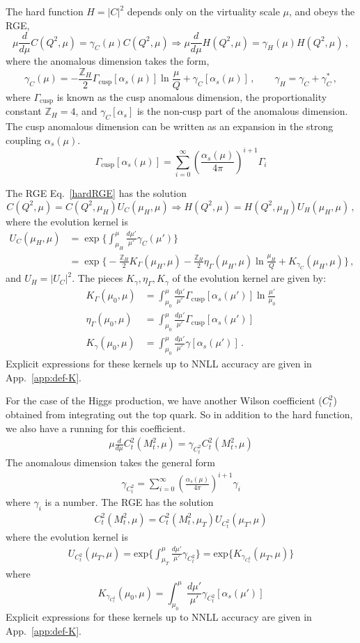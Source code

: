 \documentclass[a4,letterpaper,11pt]{article}
\newcommand{\nn}{\nonumber}
\newcommand{\be}{\begin{equation}}
\newcommand{\ee}{\end{equation}}
\newcommand{\bea}{\begin{eqnarray}}
\newcommand{\eea}{\end{eqnarray}}
\newcommand{\abs}[1]{\left\lvert #1\right\rvert}
\newcommand{\as}{\alpha_s}
\newcommand{\zed}{\mathbb{Z}}
\newcommand{\eq}[1]{Eq.~\eqref{#1}}
\newcommand{\appx}[1]{App.~\ref{app:#1}}
\begin{document}
The hard function $H=\abs{C}^2$ depends only on the virtuality scale $\mu$, and obeys the RGE,
\be
\label{hardRGE}
\mu\frac{d}{d\mu}C(Q^2,\mu) = \gamma_C(\mu)C(Q^2,\mu) \Rightarrow \mu\frac{d}{d\mu}H(Q^2,\mu) = \gamma_H(\mu)H(Q^2,\mu)\,,
\ee
where the anomalous dimension takes the form,
\be
\gamma_C(\mu) = -\frac{\zed_H}{2}\Gamma_{\text{cusp}}[\as(\mu)]\ln\frac{\mu}{Q} + \gamma_C[\as(\mu)] \,,\qquad \gamma_H = \gamma_C + \gamma_C^*\,,
\ee
where $\Gamma_{\text{cusp}}$ is known as the cusp anomalous dimension, the proportionality constant $\zed_H = 4$, and $\gamma_C[\as]$ is the non-cusp part of the anomalous dimension. The cusp anomalous dimension can be written as an expansion in the strong coupling $\alpha_s(\mu)$. 
\be
\Gamma_{\text{cusp}}[\as(\mu)] = \sum_{i=0}^{\infty}{\left(\frac{\alpha_s(\mu)}{4\pi}\right)^{i+1} \Gamma_{i}}
\ee 

The RGE \eq{hardRGE} has the solution
\be
\label{Hevolved}
C(Q^2,\mu) = C(Q^2,\mu_H)U_C(\mu_H,\mu) \Rightarrow H(Q^2,\mu) = H(Q^2,\mu_H) U_H(\mu_H,\mu)\,,
\ee
where the evolution kernel is
\begin{align}
\label{UHdef}
U_C(\mu_H,\mu) &= \exp\biggl\{ \int_{\mu_H}^\mu \frac{d\mu'}{\mu'} \gamma_C(\mu')\biggr\} \\
&= \exp\biggl\{ -\frac{\zed_H}{2} K_\Gamma(\mu_H,\mu) - \frac{\zed_H}{2}\eta_\Gamma(\mu_H,\mu)\ln\frac{\mu_H}{Q} + K_{\gamma_C}(\mu_H,\mu)\biggr\}\,, \nn
\end{align}
and $U_H = \abs{U_C}^2$. The pieces $K_\gamma,\eta_\Gamma,K_\gamma$ of the evolution kernel are given by:
\begin{subequations}
\label{Ketadef}
\begin{align}
K_\Gamma(\mu_0,\mu) &= \int_{\mu_0}^\mu \frac{d\mu'}{\mu'} \Gamma_{\text{cusp}}[\as(\mu')]\ln\frac{\mu'}{\mu_0} \\
\eta_\Gamma(\mu_0,\mu) &=  \int_{\mu_0}^\mu \frac{d\mu'}{\mu'} \Gamma_{\text{cusp}}[\as(\mu')] \\
K_\gamma(\mu_0,\mu) &= \int_{\mu_0}^\mu \frac{d\mu'}{\mu'} \gamma[\as(\mu')] \,.
\end{align}
\end{subequations}
Explicit expressions for these kernels up to NNLL accuracy are given in \appx{def-K}.

For the case of the Higgs production, we have another Wilson coefficient ($C_t^2$) obtained from integrating out the top quark. So in addition to the hard function, we also have a running for this coefficient.
\bea
\mu \frac{d}{d\mu} C_t^2(M_t^2,\mu) = \gamma_{C_t^2} C_t^2(M_t^2,\mu)
\eea
The anomalous dimension takes the general form 
\bea
 \gamma_{C_t^2} = \sum_{i=0}^{\infty} \left(\frac{\alpha_s(\mu)}{4\pi}\right)^{i+1} \gamma_i
\eea
where $\gamma_i$ is a number. The RGE has the solution 
\bea
C_t^2(M_t^2,\mu) =  C_t^2(M_t^2,\mu_T)U_{C_t^2}(\mu_T,\mu)
\eea
where the evolution kernel is 
\bea
\label{UTdef}
U_{C_t^2}(\mu_T,\mu)= \text{exp} \Bigg \{\int_{\mu_T}^{\mu}\frac{d\mu'}{\mu'}\gamma_{C_t^2}\Bigg \}= \text{exp} \Bigg \{K_{\gamma_{C_t^2}}(\mu_T, \mu) \Bigg\}
\eea
where 
\be
K_{\gamma_{C_t^2}}(\mu_0,\mu) = \int_{\mu_0}^\mu \frac{d\mu'}{\mu'} \gamma_{C_t^2}[\as(\mu')] 
\ee
Explicit expressions for these kernels up to NNLL accuracy are given in \appx{def-K}.
\end{document}
